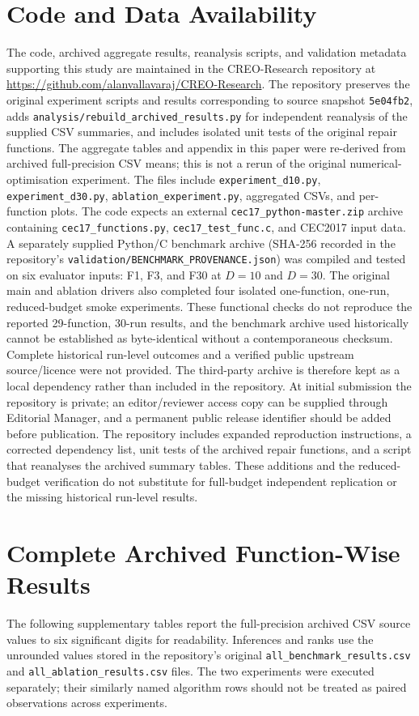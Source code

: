\documentclass[a4paper,fleqn]{cas-sc}
\begin{document}
\section*{Code and Data Availability}

The code, archived aggregate results, reanalysis scripts, and validation metadata supporting this study are maintained in the CREO-Research repository at \url{https://github.com/alanvallavaraj/CREO-Research}. The repository preserves the original experiment scripts and results corresponding to source snapshot \texttt{5e04fb2}, adds \texttt{analysis/rebuild\_archived\_results.py} for independent reanalysis of the supplied CSV summaries, and includes isolated unit tests of the original repair functions. The aggregate tables and appendix in this paper were re-derived from archived full-precision CSV means; this is not a rerun of the original numerical-optimisation experiment. The files include \texttt{experiment\_d10.py}, \texttt{experiment\_d30.py}, \texttt{ablation\_experiment.py}, aggregated CSVs, and per-function plots. The code expects an external \texttt{cec17\_python-master.zip} archive containing \texttt{cec17\_functions.py}, \texttt{cec17\_test\_func.c}, and CEC2017 input data. A separately supplied Python/C benchmark archive (SHA-256 recorded in the repository's \texttt{validation/BENCHMARK\_PROVENANCE.json}) was compiled and tested on six evaluator inputs: F1, F3, and F30 at $D=10$ and $D=30$. The original main and ablation drivers also completed four isolated one-function, one-run, reduced-budget smoke experiments. These functional checks do not reproduce the reported 29-function, 30-run results, and the benchmark archive used historically cannot be established as byte-identical without a contemporaneous checksum. Complete historical run-level outcomes and a verified public upstream source/licence were not provided. The third-party archive is therefore kept as a local dependency rather than included in the repository. At initial submission the repository is private; an editor/reviewer access copy can be supplied through Editorial Manager, and a permanent public release identifier should be added before publication. The repository includes expanded reproduction instructions, a corrected dependency list, unit tests of the archived repair functions, and a script that reanalyses the archived summary tables. These additions and the reduced-budget verification do not substitute for full-budget independent replication or the missing historical run-level results.

\appendix
\section{Complete Archived Function-Wise Results}
\label{app:archive}
The following supplementary tables report the full-precision archived CSV source values to six significant digits for readability. Inferences and ranks use the unrounded values stored in the repository's original \texttt{all\_benchmark\_results.csv} and \texttt{all\_ablation\_results.csv} files. The two experiments were executed separately; their similarly named algorithm rows should not be treated as paired observations across experiments.
\end{document}
